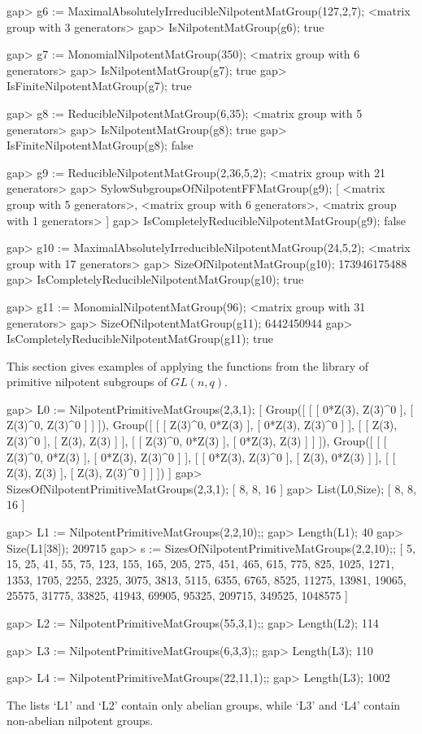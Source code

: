 gap> g6 := MaximalAbsolutelyIrreducibleNilpotentMatGroup(127,2,7);
<matrix group with 3 generators>
gap> IsNilpotentMatGroup(g6);
true

gap> g7 := MonomialNilpotentMatGroup(350);
<matrix group with 6 generators>
gap> IsNilpotentMatGroup(g7);
true
gap> IsFiniteNilpotentMatGroup(g7);
true

gap> g8 := ReducibleNilpotentMatGroup(6,35);
<matrix group with 5 generators>
gap> IsNilpotentMatGroup(g8);
true
gap> IsFiniteNilpotentMatGroup(g8);
false

gap> g9 := ReducibleNilpotentMatGroup(2,36,5,2);
<matrix group with 21 generators>
gap> SylowSubgroupsOfNilpotentFFMatGroup(g9);
[ <matrix group with 5 generators>, <matrix group with 6
generators>, <matrix group with 1 generators> ]
gap> IsCompletelyReducibleNilpotentMatGroup(g9);
false

gap> g10 := MaximalAbsolutelyIrreducibleNilpotentMatGroup(24,5,2);
<matrix group with 17 generators>
gap> SizeOfNilpotentMatGroup(g10);
173946175488
gap> IsCompletelyReducibleNilpotentMatGroup(g10);
true

gap> g11 := MonomialNilpotentMatGroup(96);
<matrix group with 31 generators>
gap> SizeOfNilpotentMatGroup(g11);
6442450944
gap> IsCompletelyReducibleNilpotentMatGroup(g11);
true
\endexample


This section gives examples of applying the functions from the
 library of primitive nilpotent subgroups of $GL(n,q)$.

\beginexample
gap> L0 := NilpotentPrimitiveMatGroups(2,3,1);
[ Group([ [ [ 0*Z(3), Z(3)^0 ], [ Z(3)^0, Z(3)^0 ] ] ]),
  Group([ [ [ Z(3)^0, 0*Z(3) ], [ 0*Z(3), Z(3)^0 ] ],
      [ [ Z(3), Z(3)^0 ], [ Z(3), Z(3) ] ],
      [ [ Z(3)^0, 0*Z(3) ], [ 0*Z(3), Z(3) ] ] ]),
  Group([ [ [ Z(3)^0, 0*Z(3) ], [ 0*Z(3), Z(3)^0 ] ],
      [ [ 0*Z(3), Z(3)^0 ], [ Z(3), 0*Z(3) ] ],
      [ [ Z(3), Z(3) ], [ Z(3), Z(3)^0 ] ] ]) ]
gap> SizesOfNilpotentPrimitiveMatGroups(2,3,1);
[ 8, 8, 16 ]
gap> List(L0,Size);
[ 8, 8, 16 ]

gap> L1 := NilpotentPrimitiveMatGroups(2,2,10);;
gap> Length(L1);
40
gap> Size(L1[38]);
209715
gap> s := SizesOfNilpotentPrimitiveMatGroups(2,2,10);;
[ 5, 15, 25, 41, 55, 75, 123, 155,
165, 205, 275, 451, 465, 615, 775, 825, 1025, 1271, 1353, 1705,
2255, 2325, 3075, 3813, 5115, 6355, 6765, 8525, 11275, 13981,
19065, 25575, 31775, 33825, 41943, 69905, 95325, 209715,
349525, 1048575 ]

gap> L2 := NilpotentPrimitiveMatGroups(55,3,1);;
gap> Length(L2);
114

gap> L3 := NilpotentPrimitiveMatGroups(6,3,3);;
gap> Length(L3);
110

gap> L4 := NilpotentPrimitiveMatGroups(22,11,1);;
gap> Length(L3);
1002
\endexample

The lists `L1' and `L2' contain only abelian groups, while `L3' and
`L4' contain non-abelian nilpotent groups.

